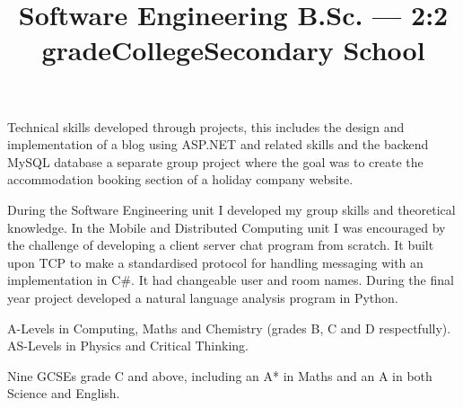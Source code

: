 \documentclass[line,margin]{res}
\newcommand{\dashsep}{--}
\newcommand{\rangesep}{\dashsep}
\newcommand{\hash}{\#}
\newcommand{\CSharp}{C\hash}
\begin{document}
\begin{resume}
\title{Software Engineering B.Sc. --- 2:2 grade}
\dates{2007{\rangesep}2010}
\begin{position}
Technical skills developed through projects, this includes the design and implementation of a blog using ASP.NET and related skills and the backend MySQL database a separate group project where the goal was to create the accommodation booking section of a holiday company website.

During the Software Engineering unit I developed my group skills and theoretical knowledge.
In the Mobile and Distributed Computing unit I was encouraged by the challenge of developing a client server chat program from scratch.
It built upon TCP to make a standardised protocol for handling messaging with an implementation in {\CSharp}.
It had changeable user and room names.
During the final year project developed a natural language analysis program in Python.
\end{position}

\title{College}
\dates{2005{\rangesep}2007}
\begin{position}
A-Levels in Computing, Maths and Chemistry (grades B, C and D respectfully). \\
AS-Levels in Physics and Critical Thinking.

\begin{comment}
\begin{tabular}{ l r r }
	Computing & A Level & B \\
	Maths & A Level & C \\
	Chemistry & A Level & D \\
	Physics & AS Level & D \\
	Critical Thinking & AS Level & E \\
\end{tabular}
\end{comment}
\end{position}

\title{Secondary School}
\dates{2002{\rangesep}2005}
\begin{position}
Nine GCSEs grade C and above, including an A* in Maths and an A in both Science and English.


\end{position}
\end{resume}
\end{document}
